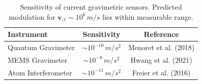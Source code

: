     \begin{table}[h!]
        \centering
        \begin{tabular}{|l|c|c|}
            \hline
            \textbf{Instrument} & \textbf{Sensitivity} & \textbf{Reference} \\
            \hline
            Quantum Gravimeter & \( \sim 10^{-10} \, \si{m/s^2} \) & Menoret et al. (2018) \\
            MEMS Gravimeter & \( \sim 10^{-8} \, \si{m/s^2} \) & Hwang et al. (2021) \\
            Atom Interferometer & \( \sim 10^{-11} \, \si{m/s^2} \) & Freier et al. (2016) \\
            \hline
        \end{tabular}
        \caption{Sensitivity of current gravimetric sensors. Predicted modulation for \( \mathbf{v}_{\scriptscriptstyle\boldsymbol{\circlearrowleft}} \sim 10^6\, \si{m/s} \) lies within measurable range.}
    \end{table}


%
%
%
%
